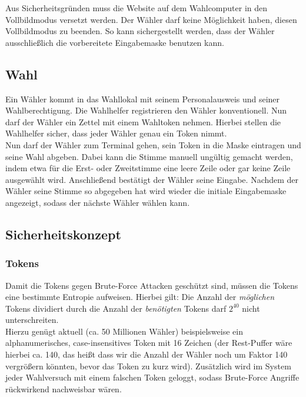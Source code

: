 \documentclass[a4paper]{scrreprt}
\begin{document}
Aus Sicherheitsgründen muss die Website auf dem Wahlcomputer in den Vollbildmodus versetzt werden. Der Wähler darf keine Möglichkeit haben, diesen Vollbildmodus zu beenden. So kann sichergestellt werden, dass der Wähler ausschließlich die vorbereitete Eingabemaske benutzen kann.

\subsection{Wahl}

Ein Wähler kommt in das Wahllokal mit seinem Personalausweis und seiner Wahlberechtigung.
Die Wahlhelfer registrieren den Wähler konventionell.
Nun darf der Wähler ein Zettel mit einem Wahltoken nehmen.
Hierbei stellen die Wahlhelfer sicher, dass jeder Wähler genau ein Token nimmt. \\

Nun darf der Wähler zum Terminal gehen, sein Token in die Maske eintragen und seine Wahl abgeben. Dabei kann die Stimme manuell ungültig gemacht werden, indem etwa für die Erst- oder Zweitstimme eine leere Zeile oder gar keine Zeile ausgewählt wird.
Anschließend bestätigt der Wähler seine Eingabe. Nachdem der Wähler seine Stimme so abgegeben hat wird wieder die initiale Eingabemaske angezeigt, sodass der nächste Wähler wählen kann.

\subsection{Sicherheitskonzept}

\subsubsection{Tokens}

Damit die Tokens gegen Brute-Force Attacken geschützt sind, müssen die Tokens eine bestimmte Entropie aufweisen.
Hierbei gilt: Die Anzahl der \textit{möglichen} Tokens dividiert durch die Anzahl der \textit{benötigten} Tokens darf $2^{40}$ nicht unterschreiten. \\

Hierzu genügt aktuell (ca. 50 Millionen Wähler) beispielsweise ein alphanumerisches, case-insensitives Token mit 16 Zeichen (der Rest-Puffer wäre hierbei ca. 140, das heißt dass wir die Anzahl der Wähler noch um Faktor 140 vergrößern könnten, bevor das Token zu kurz wird).
Zusätzlich wird im System jeder Wahlversuch mit einem falschen Token geloggt, sodass Brute-Force Angriffe rückwirkend nachweisbar wären.
\end{document}
